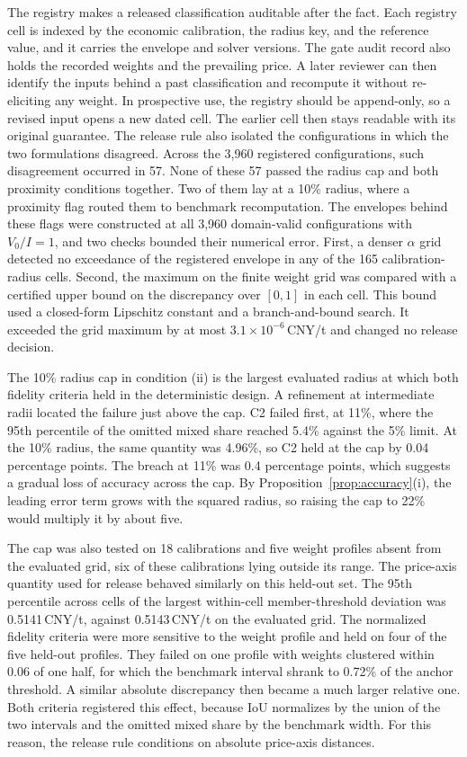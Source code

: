 \documentclass[5p,times,authoryear]{elsarticle}
\theoremstyle{plain}
\begin{document}
The registry makes a released classification auditable after the fact. Each registry cell is indexed by the economic calibration, the radius key, and the reference value, and it carries the envelope and solver versions. The gate audit record also holds the recorded weights and the prevailing price. A later reviewer can then identify the inputs behind a past classification and recompute it without re-eliciting any weight. In prospective use, the registry should be append-only, so a revised input opens a new dated cell. The earlier cell then stays readable with its original guarantee. The release rule also isolated the configurations in which the two formulations disagreed. Across the 3,960 registered configurations, such disagreement occurred in 57. None of these 57 passed the radius cap and both proximity conditions together. Two of them lay at a 10\% radius, where a proximity flag routed them to benchmark recomputation. The envelopes behind these flags were constructed at all 3,960 domain-valid configurations with $V_0/I=1$, and two checks bounded their numerical error. First, a denser $\alpha$ grid detected no exceedance of the registered envelope in any of the 165 calibration-radius cells. Second, the maximum on the finite weight grid was compared with a certified upper bound on the discrepancy over $[0,1]$ in each cell. This bound used a closed-form Lipschitz constant and a branch-and-bound search. It exceeded the grid maximum by at most $3.1\times10^{-6}$\,CNY/t and changed no release decision.

The 10\% radius cap in condition (ii) is the largest evaluated radius at which both fidelity criteria held in the deterministic design. A refinement at intermediate radii located the failure just above the cap. C2 failed first, at 11\%, where the 95th percentile of the omitted mixed share reached 5.4\% against the 5\% limit. At the 10\% radius, the same quantity was 4.96\%, so C2 held at the cap by 0.04 percentage points. The breach at 11\% was 0.4 percentage points, which suggests a gradual loss of accuracy across the cap. By Proposition~\ref{prop:accuracy}(i), the leading error term grows with the squared radius, so raising the cap to 22\% would multiply it by about five.

The cap was also tested on 18 calibrations and five weight profiles absent from the evaluated grid, six of these calibrations lying outside its range. The price-axis quantity used for release behaved similarly on this held-out set. The 95th percentile across cells of the largest within-cell member-threshold deviation was 0.5141\,CNY/t, against 0.5143\,CNY/t on the evaluated grid. The normalized fidelity criteria were more sensitive to the weight profile and held on four of the five held-out profiles. They failed on one profile with weights clustered within 0.06 of one half, for which the benchmark interval shrank to 0.72\% of the anchor threshold. A similar absolute discrepancy then became a much larger relative one. Both criteria registered this effect, because IoU normalizes by the union of the two intervals and the omitted mixed share by the benchmark width. For this reason, the release rule conditions on absolute price-axis distances.
\end{document}
